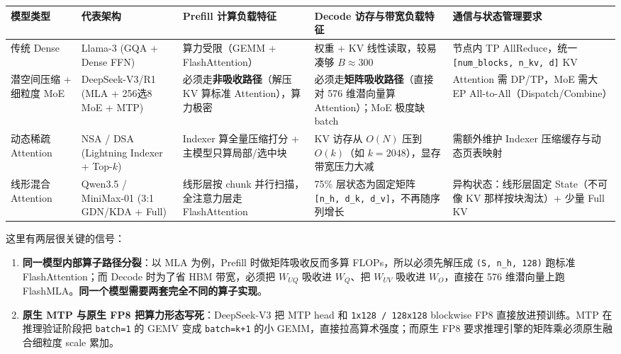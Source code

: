 \documentclass[11pt]{article}
\begin{document}
\begin{table}[htbp]
  \centering
  \small
  \begin{tabular}{p{1.8cm}p{2.4cm}p{3.4cm}p{3.4cm}p{3.4cm}}
    \hline
    \textbf{模型类型} & \textbf{代表架构} & \textbf{Prefill 计算负载特征} & \textbf{Decode 访存与带宽负载特征} & \textbf{通信与状态管理要求} \\
    \hline
    传统 Dense & Llama-3 (GQA + Dense FFN) & 算力受限（GEMM + FlashAttention） & 权重 + KV 线性读取，较易凑够 $B \approx 300$ & 节点内 TP AllReduce，统一 \texttt{[num\_blocks, n\_kv, d]} KV \\
    \hline
    潜空间压缩 + 细粒度 MoE & DeepSeek-V3/R1 (MLA + 256选8 MoE + MTP) & 必须走\textbf{非吸收路径}（解压 KV 算标准 Attention），算力极密 & 必须走\textbf{矩阵吸收路径}（直接对 576 维潜向量算 Attention）；MoE 极度缺 batch & Attention 需 DP/TP，MoE 需大 EP All-to-All（Dispatch/Combine） \\
    \hline
    动态稀疏 Attention & NSA / DSA (Lightning Indexer + Top-$k$) & Indexer 算全量压缩打分 + 主模型只算局部/选中块 & KV 访存从 $O(N)$ 压到 $O(k)$（如 $k=2048$），显存带宽压力大减 & 需额外维护 Indexer 压缩缓存与动态页表映射 \\
    \hline
    线形混合 Attention & Qwen3.5 / MiniMax-01 (3:1 GDN/KDA + Full) & 线形层按 chunk 并行扫描，全注意力层走 FlashAttention & 75\% 层状态为固定矩阵 \texttt{[n\_h, d\_k, d\_v]}，不再随序列增长 & 异构状态：线形层固定 State（不可像 KV 那样按块淘汰）+ 少量 Full KV \\
    \hline
  \end{tabular}
\end{table}

这里有两层很关键的信号：

\begin{enumerate}
  \item \textbf{同一模型内部算子路径分裂}：以 MLA 为例，Prefill 时做矩阵吸收反而多算 FLOPs，所以必须先解压成 \texttt{(S, n\_h, 128)} 跑标准 FlashAttention；而 Decode 时为了省 HBM 带宽，必须把 $W_{UQ}$ 吸收进 $W_Q$、把 $W_{UV}$ 吸收进 $W_O$，直接在 576 维潜向量上跑 FlashMLA。\textbf{同一个模型需要两套完全不同的算子实现}。
  \item \textbf{原生 MTP 与原生 FP8 把算力形态写死}：DeepSeek-V3 把 MTP head 和 \texttt{1x128 / 128x128} blockwise FP8 直接放进预训练。MTP 在推理验证阶段把 \texttt{batch=1} 的 GEMV 变成 \texttt{batch=k+1} 的小 GEMM，直接拉高算术强度；而原生 FP8 要求推理引擎的矩阵乘必须原生融合细粒度 scale 累加。
\end{enumerate}
\end{document}
